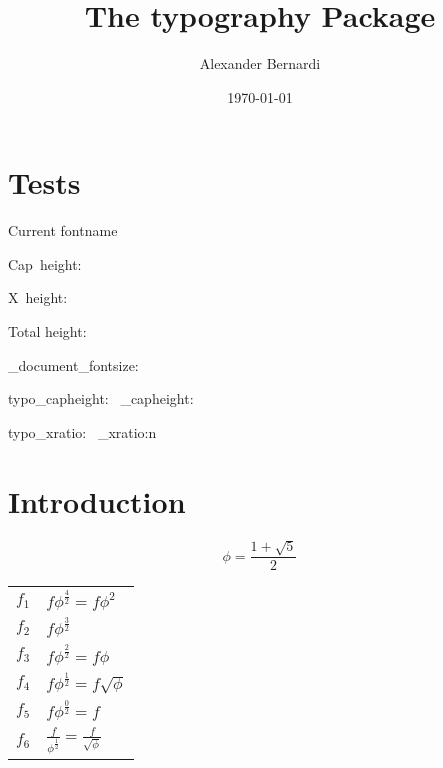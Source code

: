 \documentclass[a4paper,10pt]{scrarticle}
\title{\textnormal{The \textbf{typography} Package}}
\author{Alexander Bernardi}
\date{\today}
\begin{document}
\maketitle

\section{Tests}
Current fontname \extractfont \par
\fontname\font \par
{ \textsf \extractfont } \par 
\textsf{ \fontname\font } \par
Cap~height:~\capHeight{} \par 
X~height:~\xHeight{} \par
Total height:~\totalHeight{} \par

\ExplSyntaxOn
\typo_document_fontsize: \par
typo_capheight:~ \typo_capheight: \par
typo_xratio:~ \typo_xratio:n 

\ExplSyntaxOff

\section{Introduction}

\begin{equation}
\phi = \frac{1+\sqrt{5}}{2}
\end{equation}

\begin{tabular}{ll}
$f_{1}$ & $f\phi^{\frac{4}{2}} = f\phi^{2}$\\
$f_{2}$ & $f\phi^{\frac{3}{2}}$ \\
$f_{3}$ & $f\phi^{\frac{2}{2}} = f\phi$ \\
$f_{4}$ & $f\phi^{\frac{1}{2}} = f\sqrt{\phi}$ \\
$f_{5}$ & $f\phi^{\frac{0}{2}} = f$ \\
$f_{6}$ & $\frac{f}{\phi^{\frac{1}{2}}} = \frac{f}{\sqrt{\phi}}$ \\
\end{tabular}
\end{document}
